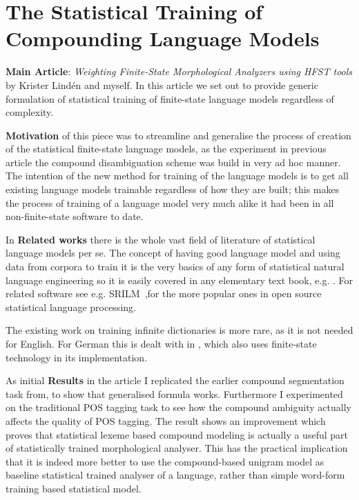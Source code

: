 \documentclass[officiallayout]{unihelcompling}
\begin{document}
\section{The Statistical Training of Compounding Language Models}

\textbf{Main Article}: \emph{Weighting Finite-State Morphological Analyzers
using HFST tools} by Krister Lindén and myself. In this article we set out
to provide generic formulation of statistical training of finite-state
language models regardless of complexity.

\textbf{Motivation} of this piece was to streamline and generalise the process
of creation of the statistical finite-state language models, as the experiment
in previous article  the compound disambiguation
scheme was build in very ad hoc manner. The intention of the new method
for training of the language models is to get all existing language models
trainable regardless of how they are built; this makes the process of training
of a language model very much alike it had been in all non-finite-state
software to date.

In \textbf{Related works} there is the whole vast field of literature of
statistical language models per se. The concept of having good language model
and using data from corpora to train it is the very basics of any form of
statistical natural language engineering so it is easily covered in any
elementary text book, e.g. \citep{manning1999foundations}. For related software
see e.g.  SRILM~\citep{stolcke2002srilm},for the more popular ones in open
source statistical language processing.

The existing work on training infinite dictionaries is more rare, as it is not
needed for English. For German this is dealt with in \citep{schiller2006german},
which also uses finite-state technology in its implementation.

As initial \textbf{Results} in the article I replicated the earlier compound
segmentation task from, to show that generalised formula works.
Furthermore I experimented on the traditional POS tagging task to see how the
compound ambiguity actually affects the quality of POS tagging. The result
shows an improvement which proves that statistical lexeme based compound
modeling is actually a useful part of statistically trained morphological
analyser. This has the practical implication that it is indeed more better to
use the compound-based unigram model as baseline statistical trained analyser
of a language, rather than simple word-form training based statistical model.
\end{document}
